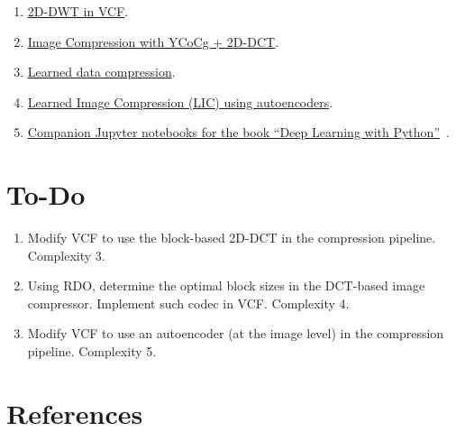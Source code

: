 \begin{enumerate}
\item \href{https://github.com/Sistemas-Multimedia/VCF/blob/main/src/DWT2D.py}{2D-DWT in VCF}.
\item
  \href{https://github.com/vicente-gonzalez-ruiz/DCT/blob/master/docs/YCoCg_2D_DCT_SQ.ipynb}{Image
    Compression with YCoCg + 2D-DCT}.
\item
  \href{https://www.tensorflow.org/tutorials/generative/data_compression}{Learned
    data compression}.
\item
  \href{https://github.com/vicente-gonzalez-ruiz/learned_image_compression/blob/main/LIC.ipynb}{Learned
    Image Compression (LIC) using autoencoders}.
\item
  \href{https://github.com/fchollet/deep-learning-with-python-notebooks}{Companion
    Jupyter notebooks for the book ``Deep Learning with
    Python''}~\cite{chollet2021deep}.
\end{enumerate}


\section{To-Do}

\begin{enumerate}
\item Modify VCF to use the block-based 2D-DCT in the compression pipeline. Complexity 3.
\item Using RDO, determine the optimal block sizes in the DCT-based
  image compressor. Implement such codec in VCF. Complexity 4.
\item Modify VCF to use an autoencoder (at the image level) in the compression pipeline. Complexity 5. 
\end{enumerate}


\section{References}

\renewcommand{\addcontentsline}[3]{}%



